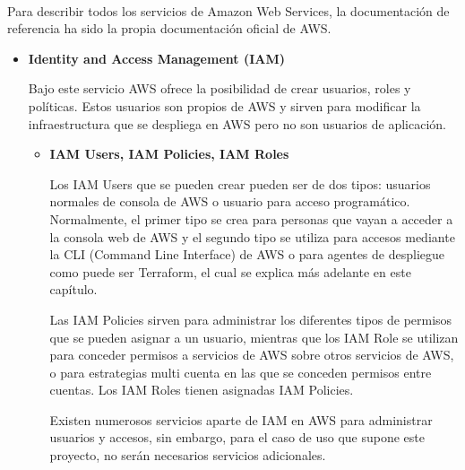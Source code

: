 \documentclass[../../memoria.tex]{subfiles}
\begin{document}
\paragraph{}
Para describir todos los servicios de Amazon Web Services, la documentación de referencia ha sido la propia documentación oficial de AWS. \cite{awsdoc}
\begin{itemize}
      \item \textbf{Identity and Access Management (IAM)}
            \par
            Bajo este servicio AWS ofrece la posibilidad de crear usuarios, roles y políticas. Estos usuarios son propios de AWS y sirven para modificar la infraestructura que se despliega en AWS pero no son usuarios de aplicación.
            \begin{itemize}
                  \item \textbf{IAM Users, IAM Policies, IAM Roles}
                        \par
                        Los IAM Users que se pueden crear pueden ser de dos tipos: usuarios normales de consola de AWS o usuario para acceso programático. Normalmente, el primer tipo se crea para personas que vayan a acceder a la consola web de AWS y el segundo tipo se utiliza para accesos mediante la CLI (Command Line Interface) de AWS o para agentes de despliegue como puede ser Terraform, el cual se explica más adelante en este capítulo.
                        \par
                        Las IAM Policies sirven para administrar los diferentes tipos de permisos que se pueden asignar a un usuario, mientras que los IAM Role se utilizan para conceder permisos a servicios de AWS sobre otros servicios de AWS, o para estrategias multi cuenta en las que se conceden permisos entre cuentas. Los IAM Roles tienen asignadas IAM Policies.
                        \par
                        Existen numerosos servicios aparte de IAM en AWS para administrar usuarios y accesos, sin embargo, para el caso de uso que supone este proyecto, no serán necesarios servicios adicionales.
            \end{itemize}


\end{itemize}
\end{document}

